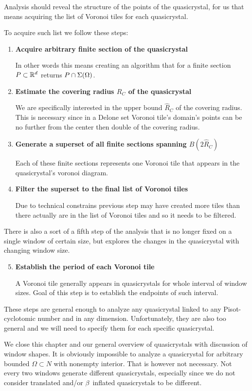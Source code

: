 \documentclass[text.tex]{subfiles}
\begin{document}
Analysis should reveal the structure of the points of the quasicrystal, for us that means acquiring the list of Voronoi tiles for each quasicrystal. 

To acquire such list we follow these steps: 
\begin{enumerate}
\item \textbf{Acquire arbitrary finite section of the quasicrystal}

In other words this means creating an algorithm that for a finite section $P\subset\mathbb{R}^d$ returns $P\cap\Sigma(\Omega)$. 
\item \textbf{Estimate the covering radius $R_C$ of the quasicrystal}

We are specifically interested in the upper bound $\hat{R}_C$ of the covering radius. This is necessary since in a Delone set Voronoi tile's domain's points can be no further from the center then double of the covering radius. 
\item \textbf{Generate a superset of all finite sections spanning $B(2\hat{R}_C)$}

Each of these finite sections represents one Voronoi tile that appears in the quasicrystal's voronoi diagram. 
\item \textbf{Filter the superset to the final list of Voronoi tiles}

Due to technical constrains previous step may have created more tiles than there actually are in the list of Voronoi tiles and so it needs to be filtered. 
\end{enumerate}

There is also a sort of a fifth step of the analysis that is no longer fixed on a single window of certain size, but explores the changes in the quasicrystal with changing window size. 
\begin{enumerate}
\setcounter{enumi}{4}
\item \textbf{Establish the period of each Voronoi tile}

A Voronoi tile generally appears in quasicrystals for whole interval of window sizes. Goal of this step is to establish the endpoints of such interval. 
\end{enumerate}

These steps are general enough to analyze any quasicrystal linked to any Pisot-cyclotomic number and in any dimension. Unfortunately, they are also too general and we will need to specify them for each specific quasicrystal. 

We close this chapter and our general overview of quasicrystals with discussion of window shapes. It is obviously impossible to analyze a quasicrystal for arbitrary bounded $\Omega\subset N$ with nonempty interior. That is however not necessary. Not every two windows generate different quasicrystals, especially since we do not consider translated and/or $\beta$~inflated quasicrystals to be different. 
\end{document}
